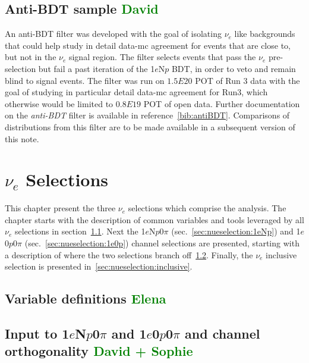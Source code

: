 \documentclass[a4paper]{article}
\newcommand{\npsel}{1$e$N$p$0$\pi$ }
\newcommand{\zpsel}{1$e$0$p$0$\pi$ }
\begin{document}
\subsection{Anti-BDT sample \textcolor{green}{David}}
\par An anti-BDT filter was developed with the goal of isolating $\nu_e$ like backgrounds that could help study in detail data-mc agreement for events that are close to, but not in the $\nu_e$ signal region. The filter selects events that pass the $\nu_e$  pre-selection but fail a past iteration of the 1$e$N$p$ BDT, in order to veto and remain blind to signal events. The filter was run on $1.5E20$ POT of Run 3 data with the goal of studying in particular detail data-mc agreement for Run3, which otherwise would be limited to $0.8E19$ POT of open data. Further documentation on the \emph{anti-BDT} filter is available in reference~\ref{bib:antiBDT}. Comparisons of distributions from this filter are to be made available in a subsequent version of this note.

\newpage

\section{$\nu_e$ Selections}
\par This chapter present the three $\nu_e$ selections which comprise the analysis. The chapter starts with the description of common variables and tools leveraged by all $\nu_e$ selections in section~\ref{sec:nueselection:variables}. Next the \npsel (sec.~\ref{sec:nueselection:1eNp}) and \zpsel (sec.~\ref{sec:nueselection:1e0p}) channel selections are presented, starting with a description of where the two selections branch off~\ref{sec:nueselection:inputs}. Finally, the $\nu_e$ inclusive selection is presented in~\ref{sec:nueselection:inclusive}.

\subsection{Variable definitions \textcolor{green}{Elena}}
\label{sec:nueselection:variables}

\clearpage

\subsection{Input to \npsel and \zpsel and channel orthogonality \textcolor{green}{David + Sophie} }
\label{sec:nueselection:inputs}
\end{document}
